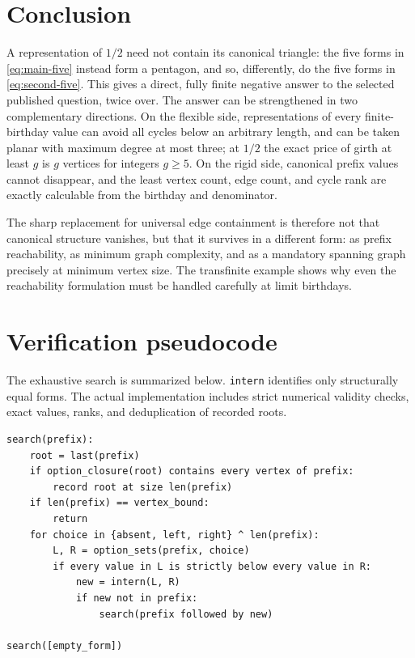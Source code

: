 \documentclass[11pt,a4paper]{article}
\numberwithin{equation}{section}
\theoremstyle{definition}
\theoremstyle{remark}
\newcommand{\code}[1]{\texttt{#1}}
\begin{document}
\section{Conclusion}

A representation of $1/2$ need not contain its canonical triangle: the five
forms in \eqref{eq:main-five} instead form a pentagon, and so, differently, do
the five forms in \eqref{eq:second-five}. This gives a direct, fully finite
negative answer to the selected published question, twice over. The answer can
be strengthened in two complementary directions. On the flexible side,
representations of every finite-birthday value can avoid all cycles below an
arbitrary length, and can be taken planar with maximum degree at most three;
at $1/2$ the exact price of girth at least $g$ is $g$ vertices for integers
$g\geq5$. On the rigid side, canonical prefix values
cannot disappear, and the least vertex count, edge count, and cycle rank are
exactly calculable from the birthday and denominator.

The sharp replacement for universal edge containment is therefore not that
canonical structure vanishes, but that it survives in a different form:
as prefix reachability, as minimum graph complexity, and as a mandatory
spanning graph precisely at minimum vertex size. The transfinite example shows
why even the reachability formulation must be handled carefully at limit
birthdays.

\appendix
\section{Verification pseudocode}
\label{app:pseudocode}

The exhaustive search is summarized below. \code{intern} identifies only
structurally equal forms. The actual implementation includes strict numerical
validity checks, exact values, ranks, and deduplication of recorded roots.

\begin{lstlisting}
search(prefix):
    root = last(prefix)
    if option_closure(root) contains every vertex of prefix:
        record root at size len(prefix)
    if len(prefix) == vertex_bound:
        return
    for choice in {absent, left, right} ^ len(prefix):
        L, R = option_sets(prefix, choice)
        if every value in L is strictly below every value in R:
            new = intern(L, R)
            if new not in prefix:
                search(prefix followed by new)

search([empty_form])
\end{lstlisting}
\end{document}
